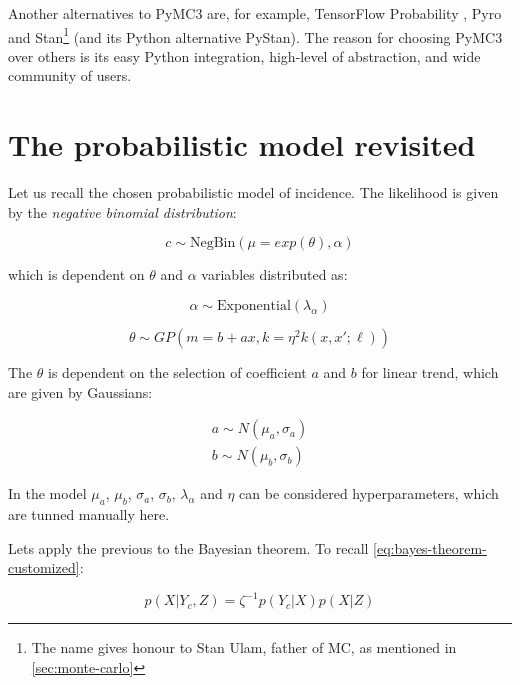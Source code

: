 \documentclass[
  digital, %
  oneside, %
  lof,     %
  lot,     %
]{fithesis4}
\begin{document}
Another alternatives to PyMC3 are, for example,
TensorFlow Probability \cite{tfp}, Pyro \cite{pyro} and
Stan\footnote{The name gives honour to Stan Ulam, father of MC, as mentioned in \autoref{sec:monte-carlo}} \cite{stanmc}
(and its Python alternative PyStan).
The reason for choosing PyMC3 over others is its
easy Python integration, high-level of abstraction,
and wide community of users.


\section{The probabilistic model revisited}

Let us recall the chosen probabilistic model of incidence.
The likelihood is given by the \textit{negative binomial distribution}:

\begin{equation}
  c \sim \text{NegBin} (\mu=exp(\theta), \alpha)
\end{equation}

which is dependent on $\theta$ and $\alpha$ variables distributed as:

\begin{equation}
  \alpha \sim \text{Exponential} (\lambda_\alpha)
\end{equation}

\begin{equation}
  \theta \sim GP(m=b + ax, k=\eta^2 k \left( x, x'; \ell \right))
\end{equation}

The $\theta$ is dependent on the selection of 
coefficient $a$ and $b$ for linear trend, which are 
given by Gaussians:

\begin{equation}
  \begin{split}
    a \sim N(\mu_a, \sigma_a) \\
    b \sim N(\mu_b, \sigma_b)
  \end{split}
\end{equation}

In the model $\mu_a$, $\mu_b$, $\sigma_a$, $\sigma_b$, 
$\lambda_\alpha$ and $\eta$ can be 
considered hyperparameters, which are tunned manually here.

Lets apply the previous to the Bayesian theorem.
To recall \eqref{eq:bayes-theorem-customized}:

\begin{equation}
  p( X | Y_c, Z ) = \zeta^{-1} p( Y_c | X ) p(X | Z)
\end{equation}
\end{document}
